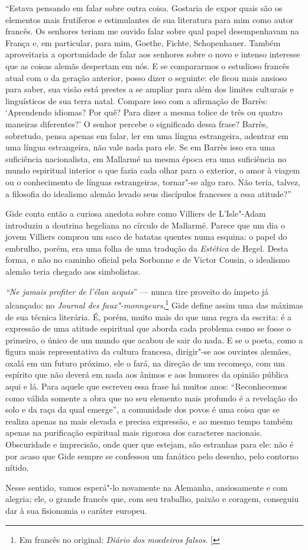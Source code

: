 ``Estava pensando em falar sobre outra coisa. Gostaria de expor quais são
os elementos mais frutíferos e estimulantes de sua literatura para mim
como autor francês. Os senhores teriam me ouvido falar sobre qual papel
desempenhavam na França e, em particular, para mim, Goethe, Fichte,
Schopenhauer. Também aproveitaria a oportunidade de falar aos
senhores sobre o novo e intenso interesse que as coisas alemãs despertam em nós.
E se compararmos o estudioso francês atual com o da geração anterior,
posso dizer o seguinte: ele ficou mais ansioso para saber, sua visão
está prestes a se ampliar para além dos limites culturais e linguísticos
de sua terra natal. Compare isso com a afirmação de Barrès: `Aprendendo
idiomas? Por quê? Para dizer a mesma tolice de três ou quatro maneiras
diferentes?' O senhor percebe o significado dessa frase? Barrès,
sobretudo, pensa apenas em falar, ler em uma língua estrangeira,
adentrar em uma língua estrangeira, não vale nada para ele. Se em Barrès
isso era uma suficiência nacionalista, em Mallarmé na mesma época era
uma suficiência no mundo espiritual interior o que fazia cada olhar para
o exterior, o amor à viagem ou o conhecimento de línguas estrangeiras,
tornar"-se algo raro. Não teria, talvez, a filosofia do idealismo alemão
levado seus discípulos franceses a essa atitude?''

Gide conta então a curiosa anedota sobre como Villiers de L'Isle"-Adam
introduziu a doutrina hegeliana no círculo de Mallarmé. Parece que um
dia o jovem Villiers comprou um saco de batatas quentes numa esquina:
o papel do embrulho, porém, era uma folha de uma tradução da
\emph{Estética} de Hegel. Desta forma, e não no caminho oficial pela
Sorbonne e de Victor Cousin, o idealismo alemão teria chegado aos
simbolistas.

\emph{``Ne jamais profiter de l'élan acquis}'' --- nunca tire proveito do
ímpeto já alcançado: no \emph{Journal des faux"-monnyeurs},\footnote{Em francês no original: \emph{Diário dos moedeiros falsos}. {[}\versal{N. T.}{]}} Gide define
assim uma das máximas de sua técnica literária. É, porém, muito mais do
que uma regra da escrita: é a expressão de uma atitude espiritual que
aborda cada problema como se fosse o primeiro, o único de um mundo que
acabou de sair do nada. E se o poeta, como a figura mais representativa
da cultura francesa, dirigir"-se aos ouvintes alemães, oxalá em um futuro
próximo, ele o fará, na direção de um recomeço, com um espírito
que não deverá em nada aos ânimos e aos humores da opinião pública aqui
e lá. Para aquele que escreveu essa frase há muitos anos:
``Reconhecemos como válida somente a obra que no seu elemento mais
profundo é a revelação do solo e da raça da qual emerge'', a comunidade
dos povos é uma coisa que se realiza apenas na mais elevada e precisa
expressão, e ao mesmo tempo também apenas na purificação espiritual mais
rigorosa dos caracteres nacionais. Obscuridade e imprecisão, onde quer
que estejam, são estranhas para ele: não é por acaso que Gide sempre se
confessou um fanático pelo desenho, pelo contorno nítido.

Nesse sentido, vamos esperá"-lo novamente na Alemanha, ansiosamente e com
alegria; ele, o grande francês que, com seu trabalho, paixão e
coragem, conseguiu dar à sua fisionomia o caráter europeu.
